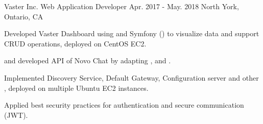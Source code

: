 \begin{cventries}
  \cventry
    {Vaster Inc.} %
    {Web Application Developer} %
    {Apr. 2017 - May. 2018} %
    {North York, Ontario, CA} %
    {
      \begin{cvitems} %
        \item {Developed Vaster Dashboard using  and Symfony () to visualize data and support CRUD operations, deployed on CentOS EC2.}
        \item { and developed  API of Novo Chat by adapting ,  and .}
          \begin{cvsubitems}
            \item {Implemented Discovery Service, Default Gateway, Configuration server and other , deployed on multiple Ubuntu EC2 instances.}
          \end{cvsubitems}
        \item {Applied best security practices for authentication and  secure communication (JWT).}
      \end{cvitems}
    }

\end{cventries}
